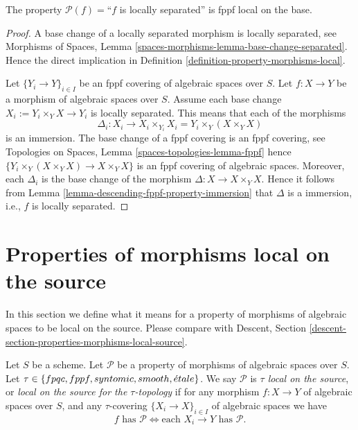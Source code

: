 \begin{lemma}
\label{lemma-descending-fppf-property-locally-separated}
The property $\mathcal{P}(f) =$``$f$ is locally separated''
is fppf local on the base.
\end{lemma}

\begin{proof}
A base change of a locally separated morphism is locally separated, see
Morphisms of Spaces,
Lemma \ref{spaces-morphisms-lemma-base-change-separated}.
Hence the direct implication in
Definition \ref{definition-property-morphisms-local}.

\medskip\noindent
Let $\{Y_i \to Y\}_{i \in I}$ be an fppf covering of algebraic spaces over $S$.
Let $f : X \to Y$ be a morphism of algebraic spaces over $S$.
Assume each base change $X_i := Y_i \times_Y X \to Y_i$ is locally separated.
This means that each of the morphisms
$$
\Delta_i :
X_i
\longrightarrow
X_i \times_{Y_i} X_i = Y_i \times_Y (X \times_Y X)
$$
is an immersion. The base change of a fppf covering is an
fppf covering, see
Topologies on Spaces, Lemma \ref{spaces-topologies-lemma-fppf}
hence $\{Y_i \times_Y (X \times_Y X) \to X \times_Y X\}$
is an fppf covering of algebraic spaces. Moreover, each
$\Delta_i$ is the base change of the morphism
$\Delta : X \to X \times_Y X$. Hence it follows from
Lemma \ref{lemma-descending-fppf-property-immersion}
that $\Delta$ is a immersion, i.e., $f$ is locally separated.
\end{proof}


















\section{Properties of morphisms local on the source}
\label{section-properties-morphisms-local-source}

\noindent
In this section we define what it means for a property of morphisms of
algebraic spaces to be local on the source. Please compare with
Descent, Section \ref{descent-section-properties-morphisms-local-source}.

\begin{definition}
\label{definition-property-morphisms-local-source}
Let $S$ be a scheme.
Let $\mathcal{P}$ be a property of morphisms of algebraic spaces over $S$.
Let $\tau \in \{fpqc,\linebreak[0] fppf,\linebreak[0] syntomic,\linebreak[0]
smooth,\linebreak[0] \acute{e}tale\}$. We say $\mathcal{P}$ is
{\it $\tau$ local on the source}, or
{\it local on the source for the $\tau$-topology} if for
any morphism $f : X \to Y$ of algebraic spaces over $S$, and any
$\tau$-covering $\{X_i \to X\}_{i \in I}$ of algebraic spaces we have
$$
f \text{ has }\mathcal{P}
\Leftrightarrow
\text{each }X_i \to Y\text{ has }\mathcal{P}.
$$
\end{definition}

